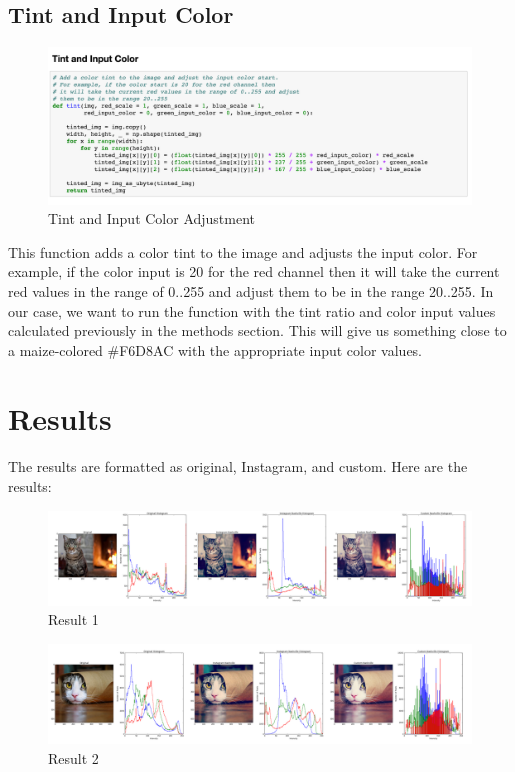 \documentclass{article}
\begin{document}
\subsection{Tint and Input Color}

\begin{figure}[H]
\includegraphics[width=\linewidth]{tint_and_input_color.png} \caption{Tint and Input Color Adjustment}
\label{fig:gammaAdjustment}
\end{figure}

This function adds a color tint to the image and adjusts the input color. For example, if the color input is 20 for the red channel then it will take the current red values in the range of 0..255 and adjust them to be in the range 20..255. In our case, we want to run the function with the tint ratio and color input values calculated previously in the methods section. This will give us something close to a maize-colored \#F6D8AC with the appropriate input color values.

\section{Results}

The results are formatted as original, Instagram, and custom. Here are the results:

\begin{figure}[H]
\includegraphics[width=\linewidth]{result1.png} \caption{Result 1}
\label{fig:result1}
\end{figure}

\begin{figure}[H]
\includegraphics[width=\linewidth]{result2.png} \caption{Result 2}
\label{fig:result2}
\end{figure}
\end{document}
